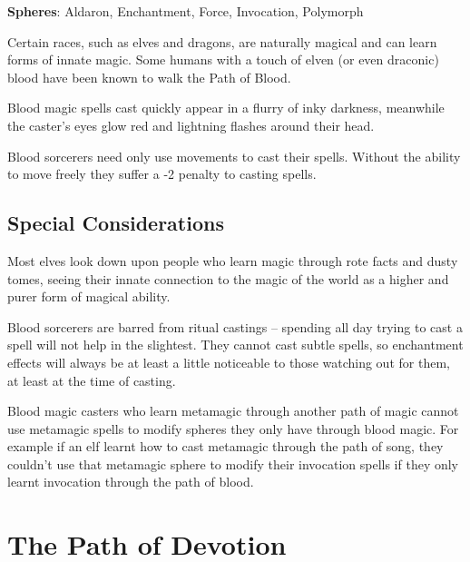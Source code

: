\documentclass[titlepage,a4paper,openany]{book}
\begin{document}
\begin{multicols}{2}

\textbf{Spheres}: Aldaron, Enchantment, Force, Invocation, Polymorph

\noindent Certain races, such as elves and dragons, are naturally magical and can learn forms of innate magic. Some humans with a touch of elven (or even draconic) blood have been known to walk the Path of Blood.

Blood magic spells cast quickly appear in a flurry of inky darkness, meanwhile the caster's eyes glow red and lightning flashes around their head.

Blood sorcerers need only use movements to cast their spells. Without the ability to move freely they suffer a -2 penalty to casting spells.

\subsection{Special Considerations}

Most elves look down upon people who learn magic through rote facts and dusty tomes, seeing their innate connection to the magic of the world as a higher and purer form of magical ability.

Blood sorcerers are barred from ritual castings -- spending all day trying to cast a spell will not help in the slightest. They cannot cast subtle spells, so enchantment effects will always be at least a little noticeable to those watching out for them, at least at the time of casting.

Blood magic casters who learn metamagic through another path of magic cannot use metamagic spells to modify spheres they only have through blood magic. For example if an elf learnt how to cast metamagic through the path of song, they couldn't use that metamagic sphere to modify their invocation spells if they only learnt invocation through the path of blood.

\end{multicols}

\section{The Path of Devotion}
\end{document}
